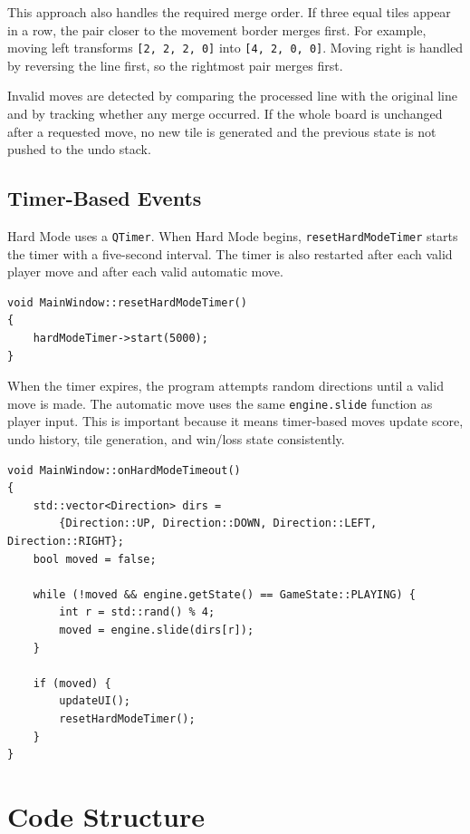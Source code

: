 \documentclass[a4paper,12pt]{article}
\begin{document}
This approach also handles the required merge order. If three equal tiles appear in a row, the pair closer to the movement border merges first. For example, moving left transforms \texttt{[2, 2, 2, 0]} into \texttt{[4, 2, 0, 0]}. Moving right is handled by reversing the line first, so the rightmost pair merges first.

Invalid moves are detected by comparing the processed line with the original line and by tracking whether any merge occurred. If the whole board is unchanged after a requested move, no new tile is generated and the previous state is not pushed to the undo stack.

\subsection{Timer-Based Events}

Hard Mode uses a \texttt{QTimer}. When Hard Mode begins, \texttt{resetHardModeTimer} starts the timer with a five-second interval. The timer is also restarted after each valid player move and after each valid automatic move.

\begin{lstlisting}[style=CppStyle,caption={Starting the Hard Mode timer}]
void MainWindow::resetHardModeTimer()
{
    hardModeTimer->start(5000);
}
\end{lstlisting}

When the timer expires, the program attempts random directions until a valid move is made. The automatic move uses the same \texttt{engine.slide} function as player input. This is important because it means timer-based moves update score, undo history, tile generation, and win/loss state consistently.

\begin{lstlisting}[style=CppStyle,caption={Hard Mode timeout logic}]
void MainWindow::onHardModeTimeout()
{
    std::vector<Direction> dirs =
        {Direction::UP, Direction::DOWN, Direction::LEFT, Direction::RIGHT};
    bool moved = false;

    while (!moved && engine.getState() == GameState::PLAYING) {
        int r = std::rand() % 4;
        moved = engine.slide(dirs[r]);
    }

    if (moved) {
        updateUI();
        resetHardModeTimer();
    }
}
\end{lstlisting}

\section{Code Structure}
\end{document}
